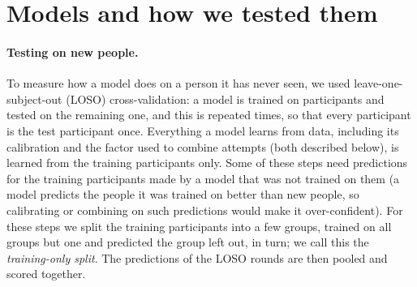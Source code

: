 \section{Models and how we tested them}\label{sec:methods}

\paragraph{Testing on new people.} To measure how a model does on a person it has never seen, we used
leave-one-subject-out (LOSO) cross-validation: a model is trained on  participants and tested
on the remaining one, and this is repeated  times, so that every participant is the test
participant once. Everything a model learns from data, including its calibration and the factor used to combine
attempts (both described below), is learned from the  training participants only. Some of
these steps need predictions for the training participants made by a model that was not trained on them (a model
predicts the people it was trained on better than new people, so calibrating or combining on such predictions would
make it over-confident). For these steps we split the training participants into a few groups, trained on all groups
but one and predicted the group left out, in turn; we call this the \emph{training-only split}. The predictions of the
 LOSO rounds are then pooled and scored together.

